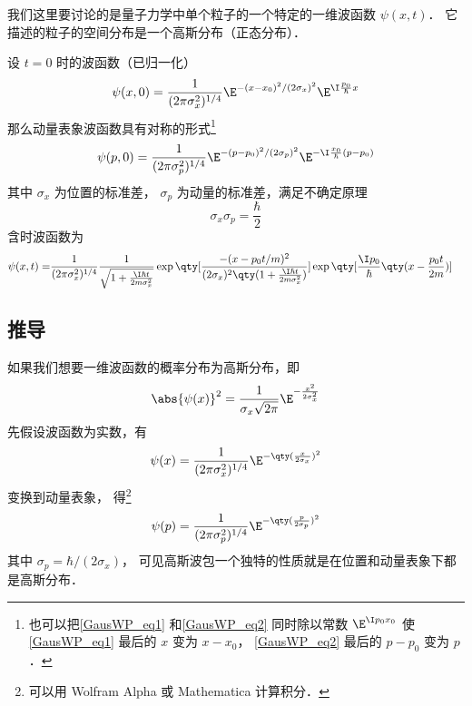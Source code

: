 


我们这里要讨论的是量子力学中单个粒子的一个特定的一维波函数 $\psi(x,t)$． 它描述的粒子的空间分布是一个高斯分布（正态分布）．

设 $t = 0$ 时的波函数（已归一化）
\begin{equation}\label{GausWP_eq1}
\psi (x,0) = \frac{1}{(2\pi\sigma_x ^2)^{1/4}} \E^{-(x - x_0)^2/(2\sigma_x)^2} \E^{\I \frac{p_0}{\hbar}x}
\end{equation}
那么动量表象波函数具有对称的形式\footnote{也可以把\autoref{GausWP_eq1} 和\autoref{GausWP_eq2} 同时除以常数 $\E^{\I p_0 x_0}$ 使\autoref{GausWP_eq1} 最后的 $x$ 变为 $x-x_0$， \autoref{GausWP_eq2} 最后的 $p-p_0$ 变为 $p$． }
\begin{equation}\label{GausWP_eq2}
\psi (p,0) = \frac{1}{(2\pi\sigma_p^2)^{1/4}} \E^{-(p - p_0)^2/(2\sigma_p)^2} \E^{-\I\frac{x_0}{\hbar }(p - p_0)}
\end{equation}
其中 $\sigma_x$ 为位置的标准差， $\sigma_p$ 为动量的标准差，满足不确定原理
\begin{equation}
\sigma_x\sigma_p = \frac{\hbar}{2}
\end{equation}
含时波函数为
\begin{equation}\begin{aligned}
\psi (x,t) = &\frac{1}{(2\pi\sigma_x^2)^{1/4}} \frac{1}{\sqrt{1 + \frac{\I\hbar t}{2m \sigma_x^2}}}
\exp\qty[\frac{-(x - p_0 t/m)^2}{(2\sigma_x )^2 \qty(1 + \frac{\I\hbar t}{2m \sigma_x^2})}] \exp\qty[\frac{\I p_0}{\hbar } \qty(x - \frac{p_0 t}{2m})]
\end{aligned}\end{equation}

\subsection{推导}

如果我们想要一维波函数的概率分布为高斯分布，即
\begin{equation}
\abs{\psi (x)}^2 = \frac{1}{\sigma_x \sqrt{2\pi}} \E^{-\frac{x^2}{2\sigma_x^2}}
\end{equation}
先假设波函数为实数，有
\begin{equation}
\psi (x) = \frac{1}{(2\pi\sigma_x^2)^{1/4}} \E^{-\qty(\frac{x}{2\sigma_x})^2}
\end{equation}
变换到动量表象，%
得\footnote{可以用 Wolfram Alpha 或 Mathematica 计算积分．}
\begin{equation}
\psi(p) = \frac{1}{(2\pi\sigma_p^2)^{1/4}} \E^{-\qty(\frac{p}{2\sigma_p})^2}
\end{equation}
其中 $\sigma_p = \hbar/(2\sigma_x)$， 可见高斯波包一个独特的性质就是在位置和动量表象下都是高斯分布．

